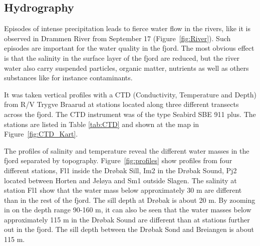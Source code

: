 \documentclass[12pt,a4paper,english]{article}
\begin{document}
\clearpage

\subsection{Hydrography}
Episodes of intense precipitation leads to fierce water flow in the rivers, 
like it is observed in Drammen River from September 17 (Figure~\ref{fig:River}).
Such episodes are important for the water quality in the fjord. 
The most obvious effect is that the salinity in the surface layer of the fjord 
are reduced, but the river water also carry suspended particles, organic matter, 
nutrients as well as others substances like for instance contaminants.       

It was taken vertical profiles with a CTD (Conductivity, Temperature and Depth)
from R/V Trygve Braarud 
at stations located along three different transects across the fjord. 
The CTD instrument was of the type Seabird SBE 911 plus.
The stations are listed in Table \ref{tab:CTD} and shown at the map in 
Figure~\ref{fig:CTD_Kart}. 

The profiles of salinity and temperature reveal the different water masses in 
the fjord separated by topography. Figure~\ref{fig:profiles} show profiles from 
four different stations, Fl1 inside the Dr{\o}bak Sill, Im2 in the Dr{\o}bak Sound, 
Pj2 located between Horten and Jel{\o}ya and Sm1 outside Slagen. 
The salinity at station Fl1 show that the water mass below approximately 30 m 
are different than in the rest of the fjord. 
The sill depth at Dr{\o}bak is about 20 m. 
By zooming in on the depth range 90-160 m, it can also be seen that the water 
masses below approximately 115 m in the Dr{\o}bak Sound are different than at 
stations further out in the fjord. The sill depth between the Dr{\o}bak Sond and 
Breiangen is about 115 m. 
\end{document}
